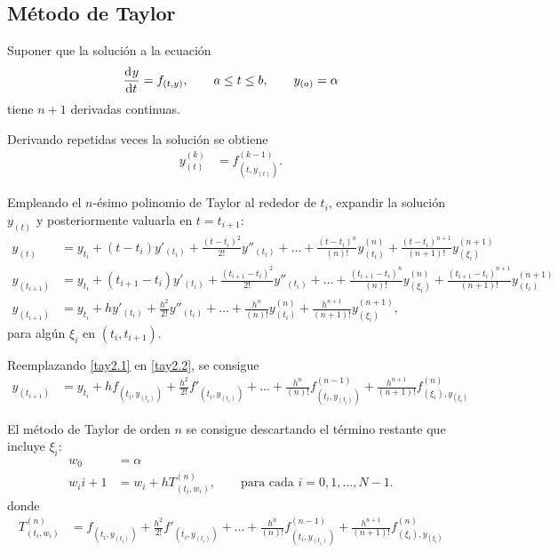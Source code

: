 \documentclass[english,spanish,Ce-table,Ce-theorem]{CabesHW}
\begin{document}
\subsection{Método de Taylor}
Suponer que la solución a la ecuación
\[ \td{y}{t} = f_{(t,y)}, \qquad a \leq t \leq b, \qquad y_{(a)} = \alpha \]
tiene $n+1$ derivadas continuas.

Derivando repetidas veces la solución se obtiene
\begin{align*}
\label{tay2.1}
    y^{(k)}_{(t)} &= f^{(k-1)}_{(t, y_{(t)})}. \tag{2.1}
\end{align*}

Empleando el $n$-ésimo polinomio de Taylor al rededor de $t_i$, expandir la solución $y_{(t)}$ y posteriormente valuarla en $t= t_{i+1}$:
\begin{align*}
    y_{(t)} &= y_{t_i} + (t-t_i)y'_{(t_i)} + \frac{(t-t_i)^2}{2!}y''_{(t_i)} + \ldots + \frac{(t-t_i)^{n}}{(n)!}y^{(n)}_{(t_i)} + \frac{(t-t_i)^{n+1}}{(n+1)!}y^{(n+1)}_{(\xi_i)}\\
    y_{(t_{i+1})} &= y_{t_i} + (t_{i+1}-t_i)y'_{(t_i)} + \frac{(t_{i+1}-t_i)^2}{2!}y''_{(t_i)} + \ldots + \frac{(t_{i+1}-t_i)^{n}}{(n)!}y^{(n)}_{(\xi_i)} + \frac{(t_{i+1}-t_i)^{n+1}}{(n+1)!}y^{(n+1)}_{(t_i)}\\
\label{tay2.2}
    y_{(t_{i+1})} &= y_{t_i} + hy'_{(t_i)} + \frac{h^2}{2!}y''_{(t_i)} + \ldots + \frac{h^{n}}{(n)!}y^{(n)}_{(t_i)} + \frac{h^{n+1}}{(n+1)!}y^{(n+1)}_{(\xi_i)}, \tag{2.2}
\end{align*}
para algún $\xi_i$ en $(t_i, t_{i+1})$.

Reemplazando \eqref{tay2.1} en \eqref{tay2.2}, se consigue
\begin{align*}
    y_{(t_{i+1})} &= y_{t_i} + hf_{(t_i, y_{(t_i)})} + \frac{h^2}{2!}f'_{(t_i, y_{(t_i)})} + \ldots + \frac{h^{n}}{(n)!}f^{(n-1)}_{(t_i, y_{(t_i)})} + \frac{h^{n+1}}{(n+1)!}f^{(n)}_{(\xi_i), y_{(\xi_i)}}
\end{align*}

El método de Taylor de orden $n$ se consigue descartando el término restante que incluye $\xi_i$:
\begin{align*}
    w_0 &= \alpha\\
    w_i{i+1} &= w_i + hT^{(n)}_{(t_i, w_i)}, \qquad \text{para cada $i = 0, 1, \ldots, N-1$}.
\end{align*}
donde
\begin{align*}
    T^{(n)}_{(t_i, w_i)} &= f_{(t_i, y_{(t_i)})} + \frac{h^2}{2!}f'_{(t_i, y_{(t_i)})} + \ldots + \frac{h^{n}}{(n)!}f^{(n-1)}_{(t_i, y_{(t_i)})} + \frac{h^{n+1}}{(n+1)!}f^{(n)}_{(\xi_i), y_{(\xi_i)}}
\end{align*}
\end{document}
